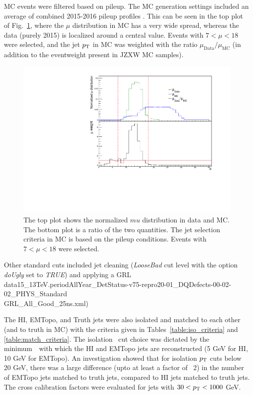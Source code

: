 MC events were filtered based on pileup. The MC generation settings included an average of combined 2015-2016 pileup profiles \cite{twiki_MC15c}. This can be seen in the top plot of Fig.~\ref{fig:mu_weight}, where the $\mu$ distribution in MC has a very wide spread, whereas the data (purely 2015) is localized around a central value. Events with $7 < \mu < 18$ were selected, and the jet $\mbox{$p_{\mathrm{T}}$}$ in MC was weighted with the ratio $\mu_{\mathrm{Data}}/\mu_{\mathrm{MC}}$ (in addition to the eventweight present in JZXW MC samples).



\begin{figure}
	\centering
	\includegraphics[width=1.0\textwidth]{figures/qualification/mu_weight.pdf}
	\caption{The top plot shows the normalized $mu$ distribution in data and MC. The bottom plot is a ratio of the two quantities. The jet selection criteria in MC is based on the pileup conditions. Events with $7 < \mu < 18$ were selected. }%
	\label{fig:mu_weight}%
\end{figure}

Other standard cuts included jet cleaning ({\it{LooseBad}} cut level with the option {\it{doUgly}} set to {\it TRUE}) and applying a GRL data15\_13TeV.periodAllYear\_DetStatus-v75-repro20-01\_DQDefects-00-02-02\_PHYS\_Standard\\GRL\_All\_Good\_25ns.xml)

The HI, EMTopo, and Truth jets were also isolated and matched to each other (and to truth in MC) with the criteria given in Tables~\ref{table:iso_criteria} and \ref{table:match_criteria}. The isolation \pt\ cut choice was dictated by the minimum\ \pT \ with which the HI and EMTopo jets are reconstructed (5 GeV for HI, 10 GeV for EMTopo). An investigation showed that for isolation $\mbox{$p_{\mathrm{T}}$}$ cuts below 20 GeV, there was a large difference (upto at least a factor of ~2) in the number of EMTopo jets matched to truth jets, compared to HI jets matched to truth jets. The cross calibration factors were evaluated for jets with $30 < \mbox{$p_{\mathrm{T}}$} < 1000 $ GeV.

